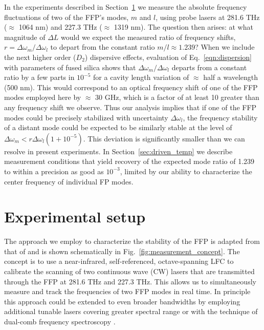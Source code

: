 \documentclass[10pt]{article}
\begin{document}
In the experiments described in Section~\ref{sec:experimental_setup} we measure the absolute frequency fluctuations of two of the FFP's modes, $m$ and $l$, using probe lasers at 281.6 THz ($\approx$ 1064 nm) and 227.3 THz ($\approx$ 1319 nm). The question then arises: at what magnitude of $\Delta L$ would we expect the measured ratio of frequency shifts, $r=\Delta \omega_m / \Delta \omega_l$ to depart from the constant ratio $m/l \approx 1.239$?  When we include the next higher order ($D_2$) dispersive effects, evaluation of Eq.~\eqref{eqn:dispersion} with parameters of fused silica shows that $\Delta \omega_m / \Delta \omega_l$ departs from a constant ratio by a few parts in $10^{-5}$ for a cavity length variation of $\approx$ half a wavelength (500 nm). This would correspond to an optical frequency shift of one of the FFP modes employed here by $\approx$ 30 GHz, which is a factor of at least 10 greater than any frequency shift we observe.  Thus our analysis implies that if one of the FFP modes could be precisely stabilized with uncertainty $\Delta \omega_l$, the frequency stability of a distant mode could be expected to be similarly stable at the level of $\Delta \omega_m < r\Delta \omega_l(1+10^{-5})$. This deviation is significantly smaller than we can resolve in present experiments.  In Section~\ref{sec:driven_temp} we describe measurement conditions that yield recovery of the expected mode ratio of 1.239 to within a precision as good as $10^{-3}$, limited by our ability to characterize the center frequency of individual FP modes. 

\section{Experimental setup}
\label{sec:experimental_setup}
The approach we employ to characterize the stability of the FFP is adapted from that of \cite{DelHaye:2009} and is shown schematically in Fig.~\ref{fig:measurement_concept}.  The concept is to use a near-infrared, self-referenced, octave-spanning LFC \cite{Ycas:2012} to calibrate the scanning of two continuous wave (CW) lasers that are transmitted through the FFP at 281.6 THz and 227.3 THz.  This allows us to simultaneously measure and track the frequencies of two FFP modes in real time.  In principle this approach could be extended to even broader bandwidths by employing additional tunable lasers covering greater spectral range or with the technique of dual-comb frequency spectroscopy \cite{Coddington:2016}.
\end{document}
